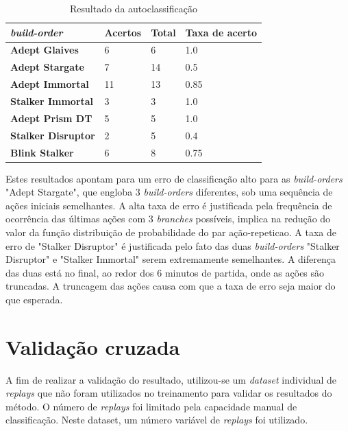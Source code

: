 \begin{table}[H]
\centering
\caption{Resultado da autoclassificação}
\label{tab:resultados-autoclassificacao}
\begin{tabular}{llll}
\toprule
	\textit{\Gls{build-order}} 		& Acertos 	& Total & Taxa de acerto 	\\ \hline
	\textbf{Adept Glaives} 		& 6  		& 6  	& 1.0				\\
	\textbf{Adept Stargate} 		& 7  		& 14 	& 0.5				\\
	\textbf{Adept Immortal} 		& 11 		& 13 	& 0.85				\\
	\textbf{Stalker Immortal} 	& 3  		& 3  	& 1.0				\\
	\textbf{Adept Prism DT} 		& 5  		& 5  	& 1.0				\\
	\textbf{Stalker Disruptor} 	& 2  		& 5 	 	& 0.4				\\
	\textbf{Blink Stalker}	 	& 6  		& 8  	& 0.75				\\
\bottomrule
\end{tabular}
\end{table}

Estes resultados apontam para um erro de classificação alto para as \textit{\glspl{build-order}} "Adept Stargate", que engloba 3 \textit{\glspl{build-order}} diferentes, sob uma sequência de ações iniciais semelhantes. A alta taxa de erro é justificada pela frequência de ocorrência das últimas ações com 3 \textit{branches} possíveis, implica na redução do valor da função distribuição de probabilidade do par ação-\gls{repeticao}. A taxa de erro de "Stalker Disruptor" é justificada pelo fato das duas \textit{\glspl{build-order}} "Stalker Disruptor" e "Stalker Immortal" serem extremamente semelhantes. A diferença das duas está no final, ao redor dos 6 minutos de partida, onde as ações são truncadas. A truncagem das ações causa com que a taxa de erro seja maior do que esperada.

		\section{Validação cruzada}
A fim de realizar a validação do resultado, utilizou-se um \textit{dataset} individual de \textit{\glspl{replay}} que não foram utilizados no treinamento para validar os resultados do método. O número de \textit{\glspl{replay}} foi limitado pela capacidade manual de classificação. Neste dataset, um número variável de \textit{\glspl{replay}} foi utilizado.

